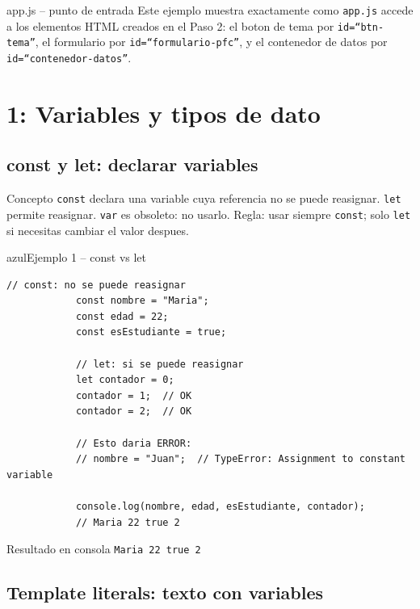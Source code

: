 \documentclass[11pt,a4paper]{article}
\begin{document}
	\begin{cajapractica}{app.js -- punto de entrada}
		Este ejemplo muestra exactamente como \texttt{app.js} accede a los elementos HTML creados en el Paso 2: el boton de tema por \texttt{id=``btn-tema''}, el formulario por \texttt{id=``formulario-pfc''}, y el contenedor de datos por \texttt{id=``contenedor-datos''}.
	\end{cajapractica}
	
	\section{1: Variables y tipos de dato}
	
	\subsection{const y let: declarar variables}
	
	\begin{cajaconcepto}{Concepto}
		\texttt{const} declara una variable cuya referencia no se puede reasignar. \texttt{let} permite reasignar. \texttt{var} es obsoleto: no usarlo. Regla: usar siempre \texttt{const}; solo \texttt{let} si necesitas cambiar el valor despues.
	\end{cajaconcepto}
	
	\begin{cajacodigo}{azul}{Ejemplo 1 -- const vs let}
		\begin{lstlisting}[style=codejs]
			// const: no se puede reasignar
			const nombre = "Maria";
			const edad = 22;
			const esEstudiante = true;
			
			// let: si se puede reasignar
			let contador = 0;
			contador = 1;  // OK
			contador = 2;  // OK
			
			// Esto daria ERROR:
			// nombre = "Juan";  // TypeError: Assignment to constant variable
			
			console.log(nombre, edad, esEstudiante, contador);
			// Maria 22 true 2
		\end{lstlisting}
	\end{cajacodigo}
	
	\begin{cajaresultado}{Resultado en consola}
		\texttt{Maria 22 true 2}
	\end{cajaresultado}
	
	\subsection{Template literals: texto con variables}
	
\end{document}
